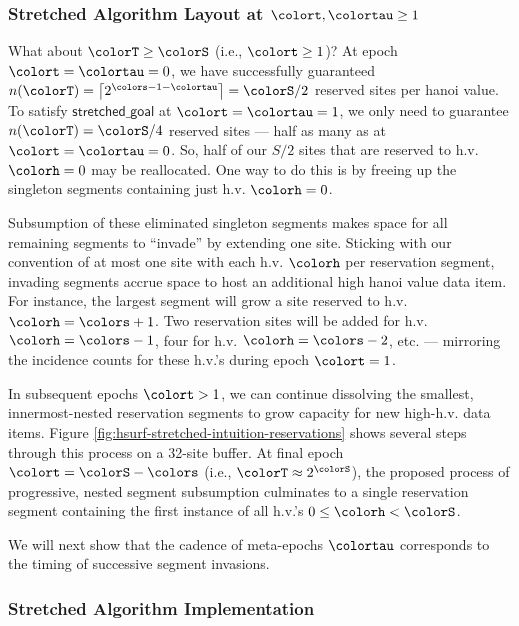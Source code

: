 \subsubsection{Stretched Algorithm Layout at $\colort,\colortau\geq1$}

What about $\colorT \geq \colorS$ (i.e., $\colort \geq 1$)?
At epoch $\colort=\colortau=0$, we have successfully guaranteed $n(\colorT) = \left\lceil2^{\colors - 1 - \colortau}\right\rceil = \colorS / 2$ reserved sites per hanoi value.
To satisfy $\textsf{stretched\_goal}$ at $\colort=\colortau=1$, we only need to guarantee $n(\colorT) = \colorS/4$ reserved sites --- half as many as at $\colort=\colortau=0$.
So, half of our $S/2$ sites that are reserved to h.v. $\colorh=0$ may be reallocated.
One way to do this is by freeing up the singleton segments containing just h.v. $\colorh=0$.

Subsumption of these eliminated singleton segments makes space for all remaining segments to ``invade'' by extending one site.
Sticking with our convention of at most one site with each h.v. $\colorh$ per reservation segment, invading segments accrue space to host an additional high hanoi value data item.
For instance, the largest segment will grow a site reserved to h.v. $\colorh=\colors +1$.
Two reservation sites will be added for h.v. $\colorh=\colors - 1$, four for h.v. $\colorh=\colors - 2$, etc. --- mirroring the incidence counts for these h.v.'s during epoch $\colort=1$.

In subsequent epochs $\colort>1$, we can continue dissolving the smallest, innermost-nested reservation segments to grow capacity for new high-h.v. data items.
Figure \ref{fig:hsurf-stretched-intuition-reservations} shows several steps through this process on a 32-site buffer.
At final epoch $\colort=\colorS-\colors$ (i.e., $\colorT \approx 2^{\colorS}$), the proposed process of progressive, nested segment subsumption culminates to a single reservation segment containing the first instance of all h.v.'s $0 \leq \colorh < \colorS$.

We will next show that the cadence of meta-epochs $\colortau$ corresponds to the timing of successive segment invasions.





\subsubsection{Stretched Algorithm Implementation}
\label{sec:stretched-implementation}

